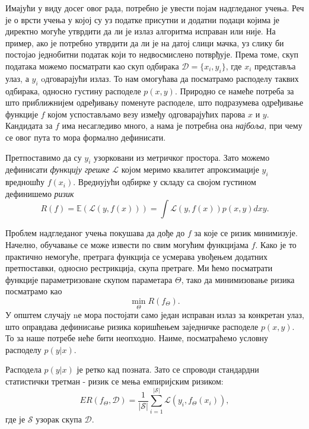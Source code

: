\documentclass[12pt, a4paper, twoside]{book}
\numberwithin{equation}{chapter}
\numberwithin{theorem}{section}
\numberwithin{definition}{section}
\numberwithin{definitionChapter}{chapter}
\begin{document}
Имајући у виду досег овог рада, потребно је увести појам надгледаног учења. Реч је о врсти
учења у којој су уз податке присутни и додатни подаци којима је директно могуће утврдити
да ли је излаз алгоритма исправан или није. На пример, ако је потребно утврдити да ли је на
датој слици мачка, уз слику би постојао једнобитни податак који то недвосмислено потврђује.
Према томе, скуп података можемо посматрати као скуп одбирака $\mathcal{D}=\{x_i, y_i\}$,
где $x_i$ представља улаз, а $y_i$ oдговарајући излаз. То нам омогућава да посматрамо
расподелу таквих одбирака, односно густину расподеле $p(x, y)$. Природно се намеће потреба
за што приближнијем одређивању поменуте расподеле, што подразумева одређивање функције $f$
којом успостављамо везу између одговарајућих парова $x$ и $y$. Кандидата за $f$ има
несагледиво много, а нама је потребна она \textit{најбоља}, при чему се овог пута то мора
формално дефинисати.

Претпоставимо да су $y_i$ узорковани из метричког простора. Зато можемо дефинисати
\textit{функцију грешке} $\mathcal{L}$ којом меримо квалитет апроксимације $y_i$
вредношћу $f(x_i)$. Вреднујући одбирке у складу са својом густином дефинишемо \textit{ризик}
\begin{equation}
	R(f) = \mathbb{E}(\mathcal{L}(y, f(x)))=\int\mathcal{L}(y, f(x))p(x, y)dxy.
	\label{eqn-risk}
\end{equation}

Проблем надгледаног учења покушава да дође до $f$ за које се ризик минимизује. Начелно,
обучавање се може извести по свим могућим функцијама $f$. Како је то практично немогуће,
претрага функција се усмерава увођењем додатних претпоставки, односно рестрикција, скупа
претраге. Ми ћемо посматрати функције параметризоване скупом параметара $\Theta$,
тако да минимизовање ризика посматрамо као
\begin{equation}
	\min_{\Theta}R(f_{\Theta}).
	\label{eqn-min-risk-theta}
\end{equation}
У општем случају nе мора постојати само један исправан излаз за конкретан улаз, што оправдава
дефинисање ризика коришћењем заједничке расподеле $p(x, y)$. То за наше потребе неће бити
неопходно. Наиме, посматраћемо условну расподелу $p(y\vert x)$.

Расподела $p(y\vert x)$ је ретко кад позната. Зато се спроводи стандардни статистички
третман - ризик се мења емпиријским ризиком:
\begin{equation}
	ER(f_\Theta, \mathcal{D}) = \frac{1}{\vert \mathcal{S}\vert}\sum_{i=1}^{\vert \mathcal{S}\vert}\mathcal{L}(y_i, f_\Theta(x_i)),
\end{equation}
где је $\mathcal{S}$ узорак скупа $\mathcal{D}$.
\end{document}
